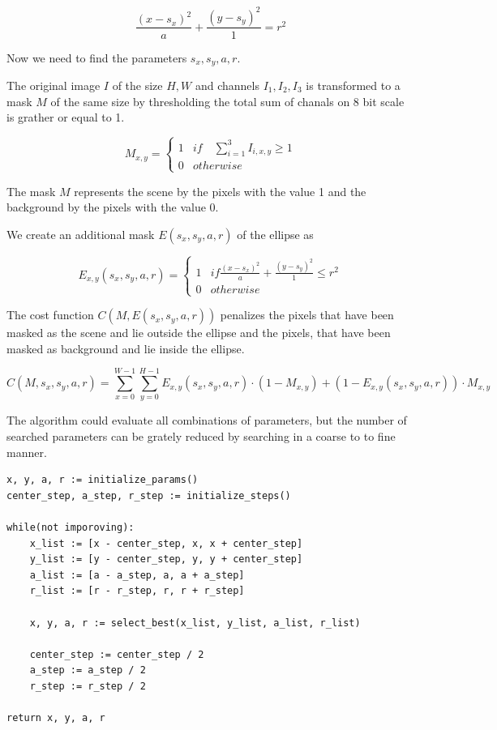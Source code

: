 \documentclass[a4paper,12pt,titlepage, twoside]{article}
\numberwithin{figure}{section}
\begin{document}
\begin{equation}
\frac{(x-s_x)^2}{a} + \frac{(y-s_y)^2}{1} = r^2
\end{equation}

Now we need to find the parameters $s_x, s_y, a, r$.

The original image $I$ of the size $H, W$ and channels $I_1, I_2, I_3$ is transformed to a mask $M$ of the same size by thresholding the total sum of chanals on 8 bit scale is grather or equal to 1. \cite{lukacs1997real}

\begin{equation*}
M_{x,y} = \begin{cases}
1 & if \quad \sum_{i=1}^{3} I_{i,x,y} \geq 1 \\
0 & otherwise
\end{cases}
\end{equation*}

The mask $M$ represents the scene by the pixels with the value 1 and the background by the pixels with the value 0. 

We create an additional mask $E(s_x, s_y, a, r)$ of the ellipse as 

\begin{equation*}
E_{x,y}(s_x, s_y, a, r) = \begin{cases}
1 & if \frac{(x-s_x)^2}{a} + \frac{(y-s_y)^2}{1} \leq r^2 \\
0 & otherwise
\end{cases}
\end{equation*}

The cost function $C(M, E(s_x, s_y, a, r))$ penalizes the pixels that have been masked as the scene and lie outside the ellipse and the pixels, that have been masked as background and lie inside the ellipse.

\begin{equation}
C(M, s_x, s_y, a, r) = \sum_{x = 0}^{W-1} \sum_{y = 0}^{H-1} E_{x,y}(s_x, s_y, a, r) \cdot (1-M_{x,y}) + (1 - E_{x,y}(s_x, s_y, a, r)) \cdot M_{x,y}
\end{equation}

The algorithm could evaluate all combinations of parameters, but the number of searched parameters can be grately reduced by searching in a coarse to to fine manner. 


\begin{verbatim}
x, y, a, r := initialize_params()
center_step, a_step, r_step := initialize_steps()

while(not imporoving):
    x_list := [x - center_step, x, x + center_step]
    y_list := [y - center_step, y, y + center_step]
    a_list := [a - a_step, a, a + a_step]
    r_list := [r - r_step, r, r + r_step]
    
    x, y, a, r := select_best(x_list, y_list, a_list, r_list)
    
    center_step := center_step / 2
    a_step := a_step / 2
    r_step := r_step / 2
    
return x, y, a, r
\end{verbatim}
\end{document}
